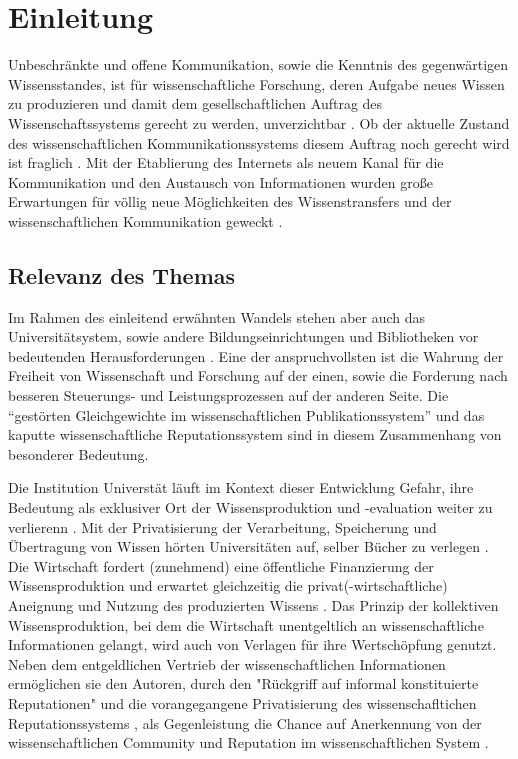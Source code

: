 \chapter{Einleitung}

Unbeschränkte und offene Kommunikation, sowie die Kenntnis des gegenwärtigen Wissensstandes, ist für wissenschaftliche Forschung, deren Aufgabe neues Wissen zu produzieren und damit dem gesellschaftlichen Auftrag des Wissenschaftssystems gerecht zu werden, unverzichtbar \cite{Hanekop_2014} \cite{glaeser2006} \cite{gibbons_1994} \cite{Luhmann1998}. Ob der aktuelle Zustand des wissenschaftlichen Kommunikationssystems diesem Auftrag noch gerecht wird ist fraglich \cite{Schekman_2013}. Mit der Etablierung des Internets als neuem Kanal für die Kommunikation und den Austausch von Informationen wurden große Erwartungen für völlig neue Möglichkeiten des Wissenstransfers und der wissenschaftlichen Kommunikation geweckt \cite{Hanekop_2014} \cite{schulze_2013_open} \cite{albert_2006_open_implications} \cite{Goodrum_2001} \cite{Lawrence_1999}.

\section{Relevanz des Themas}

Im Rahmen des einleitend erwähnten Wandels stehen aber auch das Universitätsystem, sowie andere Bildungseinrichtungen und Bibliotheken vor bedeutenden Herausforderungen \cite{Harter2006} \cite{Gu_don_2004} \cite{osterloh2008anreize}. Eine der anspruchvollsten ist die Wahrung der Freiheit von Wissenschaft und Forschung auf der einen, sowie die Forderung nach besseren Steuerungs- und Leistungsprozessen \cite{Adler_2009} \cite{gibbons_1994} auf der anderen Seite. Die “gestörten Gleichgewichte im wissenschaftlichen Publikationssystem” \cite{cite:0} und das kaputte wissenschaftliche Reputationssystem \cite{suchen} sind in diesem Zusammenhang von besonderer Bedeutung.

Die Institution Universtät läuft im Kontext dieser Entwicklung Gefahr, ihre Bedeutung als exklusiver Ort der Wissensproduktion und -evaluation weiter zu verlierenn \cite{suchen}. Mit der Privatisierung der Verarbeitung, Speicherung und Übertragung von Wissen hörten Universitäten auf, selber Bücher zu verlegen \cite{cite:0}. Die Wirtschaft fordert (zunehmend) eine öffentliche Finanzierung der Wissensproduktion und erwartet gleichzeitig die privat(-wirtschaftliche) Aneignung und Nutzung des produzierten Wissens \cite{cite:2}. Das Prinzip der kollektiven Wissensproduktion, bei dem die Wirtschaft unentgeltlich an wissenschaftliche Informationen gelangt, wird auch von Verlagen für ihre Wertschöpfung genutzt. Neben dem entgeldlichen Vertrieb der wissenschaftlichen Informationen ermöglichen sie den Autoren, durch den "Rückgriff auf informal konstituierte Reputationen" \cite{luhmann_1970_selbststeuerung} und die vorangegangene Privatisierung des wissenschafltichen Reputationssystems \cite{suchen}, als Gegenleistung die Chance auf Anerkennung von der wissenschaftlichen Community und Reputation im wissenschaftlichen System \cite{cite:21a}.

